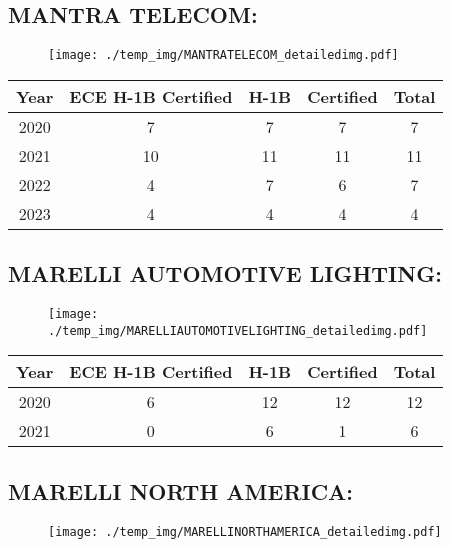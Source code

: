 \documentclass{article}%
\begin{document}
%
\newpage%
\subsection{MANTRA TELECOM:}%
\label{subsec:MANTRATELECOM}%
\label{MANTRATELECOMdetailed}%


\begin{figure}[htbp]%
\centering%
\texttt{[image: ./temp\_img/MANTRATELECOM\_detailedimg.pdf]}%
\end{figure}

%
\begin{longtable}{c|c|c|c|c}%
\hline%
Year&ECE H{-}1B Certified&H{-}1B&Certified&Total\\%
\hline%
2020&7&7&7&7\\%
\hline%
2021&10&11&11&11\\%
\hline%
2022&4&7&6&7\\%
\hline%
2023&4&4&4&4\\%
\hline%
\end{longtable}

%
\newpage%
\subsection{MARELLI AUTOMOTIVE LIGHTING:}%
\label{subsec:MARELLIAUTOMOTIVELIGHTING}%
\label{MARELLIAUTOMOTIVELIGHTINGdetailed}%


\begin{figure}[htbp]%
\centering%
\texttt{[image: ./temp\_img/MARELLIAUTOMOTIVELIGHTING\_detailedimg.pdf]}%
\end{figure}

%
\begin{longtable}{c|c|c|c|c}%
\hline%
Year&ECE H{-}1B Certified&H{-}1B&Certified&Total\\%
\hline%
2020&6&12&12&12\\%
\hline%
2021&0&6&1&6\\%
\hline%
\end{longtable}

%
\newpage%
\subsection{MARELLI NORTH AMERICA:}%
\label{subsec:MARELLINORTHAMERICA}%
\label{MARELLINORTHAMERICAdetailed}%


\begin{figure}[htbp]%
\centering%
\texttt{[image: ./temp\_img/MARELLINORTHAMERICA\_detailedimg.pdf]}%
\end{figure}
\end{document}
